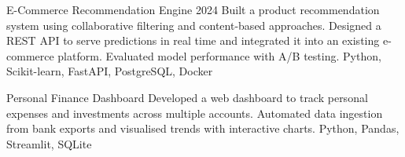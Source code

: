 %
%


\cvproject
  {E-Commerce Recommendation Engine}
  {2024}
  {Built a product recommendation system using collaborative filtering and content-based
   approaches. Designed a REST API to serve predictions in real time and integrated it
   into an existing e-commerce platform. Evaluated model performance with A/B testing.}
  {Python, Scikit-learn, FastAPI, PostgreSQL, Docker}

\cvproject
  {Personal Finance Dashboard}
  {}
  {Developed a web dashboard to track personal expenses and investments across multiple
   accounts. Automated data ingestion from bank exports and visualised trends with
   interactive charts.}
  {Python, Pandas, Streamlit, SQLite}
